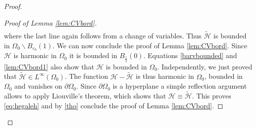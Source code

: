 \documentclass[10pt]{amsart}
\numberwithin{equation}{section}
\newcommand{\ve}{\varepsilon}
\def \h{\mathcal{H}}
\def \th{\widetilde{\mathcal{H}}}
\theoremstyle{plain}
\theoremstyle{remark}
\begin{document}
\begin{proof}
\begin{proof}[Proof of Lemma \ref{lem:CVbord}]
\begin{equation*}
\begin{aligned}
	\end{aligned} 
\end{equation*}
where the last line again follows from a change of variables. Thus $\th$ is bounded in $\Omega_0 \backslash B_{\ve_0}(1)$. We can now conclude the proof of Lemma \ref{lem:CVbord}. Since $\h$ is harmonic in $\Omega_0$ it is bounded in $B_{\frac12}(0)$. Equations \eqref{barvbounded} and \eqref{lem:CVbord1} also show that $\h$ is bounded in $\Omega_0$. Independently, we just proved that $\th \in L^\infty(\Omega_0)$. The function $\h - \th$ is thus harmonic in $\Omega_0$, bounded in $\Omega_0$ and vanishes on $\partial \Omega_0$. Since $\partial \Omega_0$ is a hyperplane a simple reflection argument allows to apply Liouville's theorem, which shows that $\h \equiv \th$. This proves \eqref{eq:hegaleh} and by \eqref{tho} conclude the proof of Lemma \ref{lem:CVbord}. 
\end{proof}


\end{proof}
\end{document}
